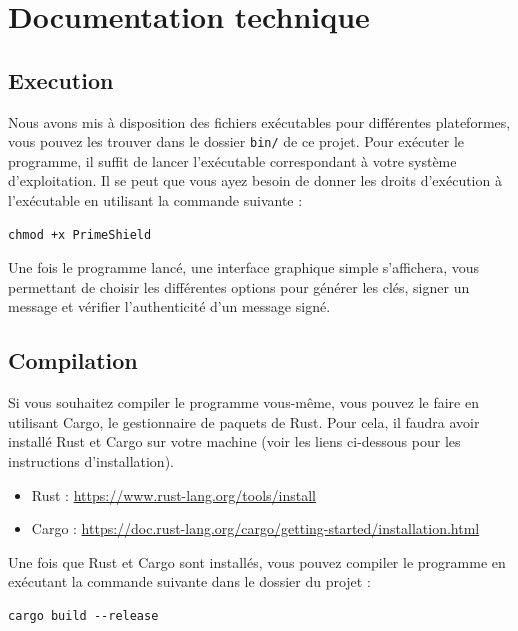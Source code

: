 \documentclass[11pt]{article}
\begin{document}
\section{Documentation technique}\label{sec:documentation-technique}

\subsection{Execution}\label{subsec:execution}

Nous avons mis à disposition des fichiers exécutables pour différentes plateformes, vous pouvez les trouver dans le dossier \texttt{bin/} de ce projet.
Pour exécuter le programme, il suffit de lancer l'exécutable correspondant à votre système d'exploitation.
Il se peut que vous ayez besoin de donner les droits d'exécution à l'exécutable en utilisant la commande suivante :

\lstset{language=bash}
\begin{lstlisting}[caption={Attribution des droits d'exécution à l'exécutable}, label={lst:chmod}]
chmod +x PrimeShield
\end{lstlisting}

Une fois le programme lancé, une interface graphique simple s'affichera, vous permettant de choisir les différentes options pour générer les clés, signer un message et vérifier l'authenticité d'un message signé.

\subsection{Compilation}\label{subsec:compilation}

Si vous souhaitez compiler le programme vous-même, vous pouvez le faire en utilisant Cargo, le gestionnaire de paquets de Rust.
Pour cela, il faudra avoir installé Rust et Cargo sur votre machine (voir les liens ci-dessous pour les instructions d'installation).

\begin{itemize}
\item Rust : \url{https://www.rust-lang.org/tools/install}
\item Cargo : \url{https://doc.rust-lang.org/cargo/getting-started/installation.html}
\end{itemize}

Une fois que Rust et Cargo sont installés, vous pouvez compiler le programme en exécutant la commande suivante dans le dossier du projet :

\lstset{language=bash}
\begin{lstlisting}[caption={Compilation du programme avec Cargo}, label={lst:cargo_build}]
cargo build --release
\end{lstlisting}
\end{document}
